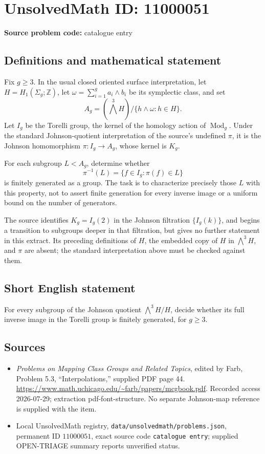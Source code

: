 \documentclass[11pt]{article}
\newcommand{\Z}{\mathbb{Z}}
\begin{document}
\section*{UnsolvedMath ID: 11000051}
\textbf{Source problem code:} catalogue entry
\subsection{Definitions and mathematical statement}
Fix \(g\geq3\). In the usual closed oriented surface interpretation, let \(H=H_1(\Sigma_g;\Z)\), let \(\omega=\sum_{i=1}^g a_i\wedge b_i\) be its symplectic class, and set
\[
 A_g=(\bigwedge^3 H)/\{h\wedge\omega:h\in H\}.
\]
Let \(I_g\) be the Torelli group, the kernel of the homology action of \(\operatorname{Mod}_g\). Under the standard Johnson-quotient interpretation of the source's undefined \(\pi\), it is the Johnson homomorphism \(\pi:I_g\to A_g\), whose kernel is \(K_g\).

For each subgroup \(L< A_g\), determine whether
\[
 \pi^{-1}(L)=\{f\in I_g:\pi(f)\in L\}
\]
is finitely generated as a group. The task is to characterize precisely those \(L\) with this property, not to assert finite generation for every inverse image or a uniform bound on the number of generators.

The source identifies \(K_g=I_g(2)\) in the Johnson filtration \(\{I_g(k)\}\), and begins a transition to subgroups deeper in that filtration, but gives no further statement in this extract. Its preceding definitions of \(H\), the embedded copy of \(H\) in \(\bigwedge^3H\), and \(\pi\) are absent; the standard interpretation above must be checked against them.
\subsection{Short English statement}
For every subgroup of the Johnson quotient \(\bigwedge^3H/H\), decide whether its full inverse image in the Torelli group is finitely generated, for \(g\geq3\).
\subsection{Sources}
\begin{itemize}
\item \emph{Problems on Mapping Class Groups and Related Topics}, edited by Farb, Problem 5.3, ``Interpolations,'' supplied PDF page 44. \url{https://www.math.uchicago.edu/~farb/papers/mcgbook.pdf}. Recorded access 2026-07-29; extraction pdf-font-structure. No separate Johnson-map reference is supplied with the item.
\item Local UnsolvedMath registry, \texttt{data/unsolvedmath/problems.json}, permanent ID \(11000051\), exact source code \texttt{catalogue entry}; supplied OPEN-TRIAGE summary reports unverified status.
\end{itemize}
\end{document}
